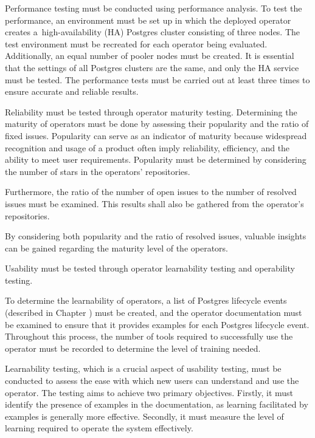 Performance testing must be conducted using performance analysis. To test the performance, an environment must be set up in which the deployed operator creates a high-availability (HA) Postgres cluster consisting of three nodes.
The test environment must be recreated for each operator being evaluated. Additionally, an equal number of pooler nodes must be created. It is essential that the settings of all Postgres clusters are the same, and only the HA service must be tested.
The performance tests must be carried out at least three times to ensure accurate and reliable results.

Reliability must be tested through operator maturity testing.
Determining the maturity of operators must be done by assessing their popularity and the ratio of fixed issues. Popularity can serve as an indicator of maturity because widespread recognition and usage of a product often imply reliability, efficiency, and the ability to meet user requirements.
Popularity must be determined by considering the number of stars in the operators' repositories.

Furthermore, the ratio of the number of open issues to the number of resolved issues must be examined. This results shall also be gathered from the operator’s repositories.

By considering both popularity and the ratio of resolved issues, valuable insights can be gained regarding the maturity level of the operators.

Usability must be tested through operator learnability testing and operability testing.

To determine the learnability of operators, a list of Postgres lifecycle events (described in Chapter ) must be created, and the operator documentation must be examined to ensure that it provides examples for each Postgres lifecycle event. Throughout this process, the number of tools required to successfully use the operator must be recorded to determine the level of training needed.

Learnability testing, which is a crucial aspect of usability testing, must be conducted to assess the ease with which new users can understand and use the operator. The testing aims to achieve two primary objectives. Firstly, it must identify the presence of examples in the documentation, as learning facilitated by examples is generally more effective. Secondly, it must measure the level of learning required to operate the system effectively.

